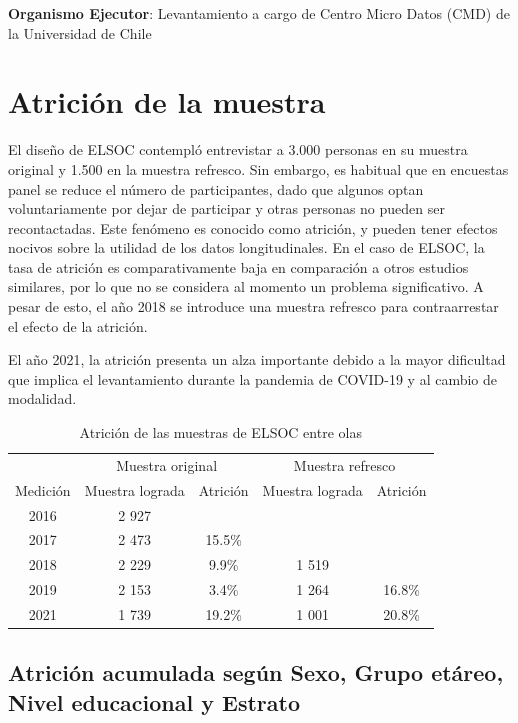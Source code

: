 \documentclass[
  12pt,
]{book}
\begin{document}
\textbf{Organismo Ejecutor}: Levantamiento a cargo de Centro Micro Datos (CMD) de la Universidad de Chile

\hypertarget{atriciuxf3n-de-la-muestra}{%
\section*{Atrición de la muestra}\label{atriciuxf3n-de-la-muestra}}

El diseño de ELSOC contempló entrevistar a 3.000 personas en su muestra original y 1.500 en la muestra refresco. Sin embargo, es habitual que en encuestas panel se reduce el número de participantes, dado que algunos optan voluntariamente por dejar de participar y otras personas no pueden ser recontactadas. Este fenómeno es conocido como atrición, y pueden tener efectos nocivos sobre la utilidad de los datos longitudinales. En el caso de ELSOC, la tasa de atrición es comparativamente baja en comparación a otros estudios similares, por lo que no se considera al momento un problema significativo. A pesar de esto, el año 2018 se introduce una muestra refresco para contraarrestar el efecto de la atrición.

El año 2021, la atrición presenta un alza importante debido a la mayor dificultad que implica el levantamiento durante la pandemia de COVID-19 y al cambio de modalidad.

\begin{table}

\caption{\label{tab:tabla-atricion}Atrición de las muestras de ELSOC entre olas}
\centering
\begin{tabular}[t]{c|c|c|c|c}
\hline
\multicolumn{1}{c|}{ } & \multicolumn{2}{c|}{Muestra original} & \multicolumn{2}{c}{Muestra refresco} \\
\cline{2-3} \cline{4-5}
Medición & Muestra lograda & Atrición & Muestra lograda & Atrición\\
\hline
2016 & 2 927 &  &  & \\
\hline
2017 & 2 473 & 15.5\% &  & \\
\hline
2018 & 2 229 & 9.9\% & 1 519 & \\
\hline
2019 & 2 153 & 3.4\% & 1 264 & 16.8\%\\
\hline
2021 & 1 739 & 19.2\% & 1 001 & 20.8\%\\
\hline
\end{tabular}
\end{table}

\hypertarget{atriciuxf3n-acumulada-seguxfan-sexo-grupo-etuxe1reo-nivel-educacional-y-estrato}{%
\subsection*{Atrición acumulada según Sexo, Grupo etáreo, Nivel educacional y Estrato}\label{atriciuxf3n-acumulada-seguxfan-sexo-grupo-etuxe1reo-nivel-educacional-y-estrato}}
\end{document}
